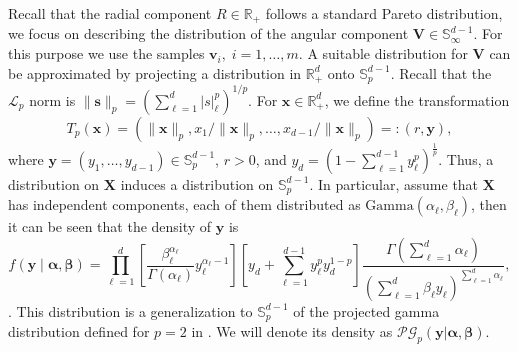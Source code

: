 Recall that the radial component $R \in {\mathbb R}_+$ follows a standard 
    Pareto distribution, we focus on describing the distribution of the angular 
    component $\bm{V}\in {\mathbb S}_{\infty}^{d-1}$. For this purpose we use 
    the samples $\bm{v}_i ,\; i=1, \ldots ,m$. A suitable distribution for 
    $\bm{V}$ can be approximated by projecting a distribution in 
    $\mathbb{R}_+^d$ onto $\mathbb{S}_{p}^{d-1}$. Recall that the 
    $\mathcal{L}_p$ norm is 
    $\lVert \bm{s} \rVert_p = (\sum_{\ell = 1}^d \rvert s\lvert_{\ell}^p)^{1/p}$. 
    For $\bm{x} \in\mathbb{R}_+^d$, we define the transformation 
    \[
        T_p(\bm{x}) = (\lVert\bm{x}\rVert_p, x_1/\lVert\bm{x}\rVert_p, \ldots, 
        x_{d-1}/\lVert\bm{x}\rVert_p)=: (r,\bm{y}),
    \] where
    $\bm{y} = (y_1, \ldots , y_{d-1}) \in \mathbb{S}_{p}^{d-1}$, $r>0$, and 
    $y_d = \left(1 - \sum_{\ell = 1}^{d-1}y_\ell^p\right)^{\frac{1}{p}}$.
    Thus, a distribution on $\bm{X}$ induces a distribution on 
    $\mathbb{S}_{p}^{d-1}$. In particular, assume that $\bm{X}$ has independent 
    components, each of them distributed as 
    $\text{Gamma}(\alpha_{\ell}, \beta_{\ell})$, then it can be seen that the 
    density of $\bm{y}$ is
    \begin{equation}
        \label{eqn:projgamma}
        f(\bm{ y}\mid\bm{ \alpha},\bm{ \beta}) =
            \prod_{\ell = 1}^d\left[
                \frac{\beta_{\ell}^{\alpha_{\ell}}}{\Gamma(\alpha_{\ell})}
                y_{\ell}^{\alpha_{\ell} - 1}
                \right]
            \left[y_d +
                {\textstyle \sum}_{\ell = 1}^{d-1}y_{\ell}^py_d^{1 - p}
                \right]
            \frac{\Gamma({\textstyle\sum}_{\ell = 1}^d\alpha_{\ell})}{
                    \left({\textstyle\sum}_{\ell = 1}^d
                \beta_{\ell}y_{\ell}\right)^{
                    {\scriptstyle\sum_{\ell = 1}^d \alpha_{\ell}}}
                },
  \end{equation}
    \citep[see,][for details]{trubey:pg}. This distribution is a generalization 
    to $\mathbb{S}_{p}^{d-1}$ of the projected gamma distribution defined for 
    $p=2$ in \cite{nunez2019}. We will denote its density as 
    $\mathcal{PG}_p(\bm{y}|\bm{\alpha},\bm{\beta})$.

